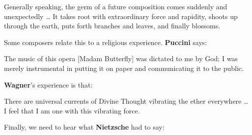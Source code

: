 \begin{quotex}
Generally speaking, the germ of a future composition comes suddenly and unexpectedly … It takes root with extraordinary force and rapidity, shoots up through the earth, puts forth branches and leaves, and finally blossoms. 

\end{quotex}
Some composers relate this to a religious experience. \textbf{Puccini} says:

\begin{quotex}
The music of this opera [Madam Butterfly] was dictated to me by God; I was merely instrumental in putting it on paper and communicating it to the public. 

\end{quotex}
\textbf{Wagner}'s experience is that:

\begin{quotex}
There are universal currents of Divine Thought vibrating the ether everywhere … I feel that I am one with this vibrating force. 

\end{quotex}
Finally, we need to hear what \textbf{Nietzsche} had to say:

